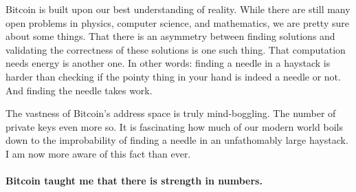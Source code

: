 Bitcoin is built upon our best understanding of reality. While there are
still many open problems in physics, computer science, and mathematics,
we are pretty sure about some things. That there is an asymmetry between
finding solutions and validating the correctness of these solutions is
one such thing. That computation needs energy is another one. In other
words: finding a needle in a haystack is harder than checking if the
pointy thing in your hand is indeed a needle or not. And finding the
needle takes work.

The vastness of Bitcoin's address space is truly mind-boggling. The
number of private keys even more so. It is fascinating how much of our
modern world boils down to the improbability of finding a needle in an
unfathomably large haystack. I am now more aware of this fact than ever.

\paragraph{Bitcoin taught me that there is strength in numbers.}

%
%
%
%
